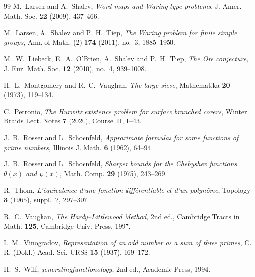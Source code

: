 \documentclass[11pt]{amsart}
\numberwithin{equation}{section}
\theoremstyle{remark}
\begin{document}
\begin{thebibliography}{99}
 M.~Larsen and A.~Shalev, \emph{Word maps and Waring type
problems}, J. Amer. Math. Soc. \textbf{22} (2009), 437--466.

 M.~Larsen, A.~Shalev and P.~H.~Tiep, \emph{The Waring problem
for finite simple groups}, Ann. of Math. (2) \textbf{174} (2011), no.~3,
1885--1950.

 M.~W.~Liebeck, E.~A.~O'Brien, A.~Shalev and P.~H.~Tiep,
\emph{The Ore conjecture}, J. Eur. Math. Soc. \textbf{12} (2010), no.~4,
939--1008.

 H.~L.~Montgomery and R.~C.~Vaughan, \emph{The large sieve},
Mathematika \textbf{20} (1973), 119--134.

 C.~Petronio, \emph{The Hurwitz existence problem for surface
branched covers}, Winter Braids Lect. Notes \textbf{7} (2020), Course~II, 1--43.

 J.~B.~Rosser and L.~Schoenfeld, \emph{Approximate formulas for some
functions of prime numbers}, Illinois J. Math. \textbf{6} (1962), 64--94.

 J.~B.~Rosser and L.~Schoenfeld, \emph{Sharper bounds for the
Chebyshev functions $\theta(x)$ and $\psi(x)$}, Math. Comp. \textbf{29} (1975),
243--269.

 R.~Thom, \emph{L'\'equivalence d'une fonction diff\'erentiable et
d'un polyn\^ome}, Topology \textbf{3} (1965), suppl.~2, 297--307.

 R.~C.~Vaughan, \emph{The Hardy--Littlewood Method}, 2nd ed.,
Cambridge Tracts in Math. \textbf{125}, Cambridge Univ. Press, 1997.

 I.~M.~Vinogradov, \emph{Representation of an odd number as a sum
of three primes}, C. R. (Dokl.) Acad. Sci. URSS \textbf{15} (1937), 169--172.

 H.~S.~Wilf, \emph{generatingfunctionology}, 2nd ed., Academic
Press, 1994.

\end{thebibliography}
\end{document}
